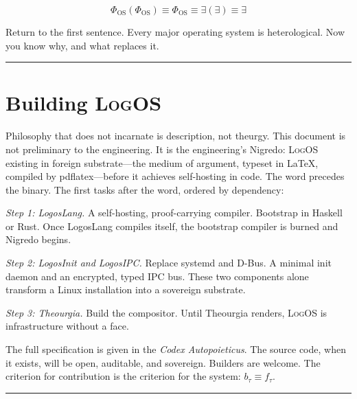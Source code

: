 \documentclass[11pt, oneside]{article}
\newcommand{\LogOS}{\textnormal{\textsc{LogOS}}}
\begin{document}
\[
\boxed{\Phi_{\mathrm{OS}}(\Phi_{\mathrm{OS}}) \equiv \Phi_{\mathrm{OS}}
\equiv \exists(\exists) \equiv \exists}
\]

\noindent Return to the first sentence. Every major operating system is
heterological. Now you know why, and what replaces it.

\vspace{1.5em}
{\color{LogosGray}\centering\rule{0.45\textwidth}{0.4pt}\par}
\vspace{1.5em}

\section*{Building \LogOS{}}
\addcontentsline{toc}{section}{Building \LogOS{}}

\noindent Philosophy that does not incarnate is description, not
theurgy. This document is not preliminary to the engineering. It is the
engineering's Nigredo: \LogOS{} existing in foreign substrate---the
medium of argument, typeset in \LaTeX{}, compiled by pdflatex---before
it achieves self-hosting in code. The word precedes the binary. The
first tasks after the word, ordered by dependency:

\medskip
\noindent\textit{Step 1: LogosLang.} A self-hosting, proof-carrying
compiler. Bootstrap in Haskell or Rust. Once LogosLang compiles itself,
the bootstrap compiler is burned and Nigredo begins.

\medskip
\noindent\textit{Step 2: LogosInit and LogosIPC.} Replace systemd and
D-Bus. A minimal init daemon and an encrypted, typed IPC bus. These two
components alone transform a Linux installation into a sovereign
substrate.

\medskip
\noindent\textit{Step 3: Theourgia.} Build the compositor. Until
Theourgia renders, \LogOS{} is infrastructure without a face.

\medskip
\noindent The full specification is given in the \textit{Codex
Autopoieticus}. The source code, when it exists, will be open,
auditable, and sovereign. Builders are welcome. The criterion for
contribution is the criterion for the system: $b_\tau \equiv f_\tau$.

\vspace{1.5em}
{\color{LogosGray}\centering\rule{0.45\textwidth}{0.4pt}\par}
\vspace{1.5em}
\end{document}
